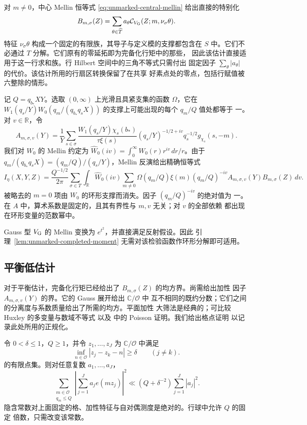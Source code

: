 对 $m\ne0$，中心 Mellin 恒等式
\eqref{eq:unmarked-central-mellin} 给出直接的特别化
\[
 B_{m,\sigma}(Z)=\sum_{\theta\in\widehat T}a_\theta
       \mathcal C_{V_{\rm G}}(Z;m,\nu_\sigma\theta).
\]
特征 $\nu_\sigma\theta$ 构成一个固定的有限族，其导子与定义模的支撑都包含在
$S$ 中。它们不必通过 $T$ 分解。它们原有的零延拓即为完备化行矩中的那些，
因此该估计直接适用于这一行求和族。行 Hilbert 空间中的三角不等式只需付出
固定因子 $\sum_\theta|a_\theta|$ 的代价。该估计所用的行扇区转换保留了在共享
好素点处的零点，包括行赋值被六整除的情形。

记 $Q=q_{b_*}XY$。选取 $(0,\infty)$ 上光滑且具紧支集的函数 $\Omega$，它在
$W_1(q_s/Y)W_0(q_m/(q_{b_*}q_sX))$ 的支撑上可能出现的每个 $q_m/Q$ 值处都等于
一。对 $v\in\mathbb R$，令
\[
 A_{m,\sigma,v}(Y)=\frac1Y\sum_{s\in\sigma}
 \frac{W_1(q_s/Y)\chi_s(b_*)}{\tau\xi(s)}
 (q_s/Y)^{-1/2+iv}q_s^{-1/2}g_{\chi_s}(s,-m).
\]
我们对 $W_0$ 的 Mellin 约定为
$\widehat W_0(iv)=\int_0^\infty W_0(r)r^{iv}\,dr/r$。由于
$q_m/(q_{b_*}q_sX)=(q_m/Q)/(q_s/Y)$，Mellin 反演给出精确恒等式
\begin{equation}\label{eq:low-separated}
 I_\eta(X,Y,Z)=\frac{Q^{-1/2}}{2\pi}
 \sum_{\sigma\in T}\int_{\mathbb R}\widehat W_0(iv)
 \sum_{m\ne0}\Omega(q_m/Q)\xi(m)(q_m/Q)^{-iv}
                 A_{m,\sigma,v}(Y)B_{m,\sigma}(Z)\,dv.
\end{equation}
被略去的 $m=0$ 项由 $W_0$ 的环形支撑而消失。因子 $(q_m/Q)^{-iv}$ 的绝对值为
一。在 $A$ 中，算术系数是固定的，且其有界性与 $m,v$ 无关；对 $v$ 的全部依赖
都出现在环形变量的范数幂中。

Gauss 型 $V_{\rm G}$ 的 Mellin 变换为 $e^{t^2}$，并直接满足反射假设。因此
引理~\ref{lem:unmarked-completed-moment} 无需对该检验函数作环形分解即可适用。

\subsection{平衡低估计}

对于平衡估计，完备化行矩已经给出了 $B_{m,\sigma}(Z)$ 的均方界。尚需给出加性
因子 $A_{m,\sigma,v}(Y)$ 的界。它的 Gauss 展开给出 $\mathbb C/\mathcal O$ 中
互不相同的既约分数；它们之间的分离度与系数质量给出了所需的均方。平面加性
大筛法是经典的；可比较 Huxley 的多变量与数域不等式 \cite{Huxley} 以及
\cite[第~3 节，定理~3]{BaierBansal} 中的 Poisson 证明。我们给出格点证明
以记录此处所用的正规化。

\begin{lemma}[平面加性大筛法]
\label{lem:planar-additive-sieve}
令 $0<\delta\le1$，$Q\ge1$，并令 $z_1,\ldots,z_J$ 为 $\mathbb C/\mathcal O$
中满足
\[
 \inf_{n\in\mathcal O}|z_j-z_k-n|\ge\delta
 \qquad(j\ne k).
\]
的有限点集。则对任意复数 $a_1,\ldots,a_J$，
\[
 \sum_{\substack{m\in\mathcal O\\q_m\le Q}}
 \left|\sum_{j=1}^J a_j e(mz_j)\right|^2
 \ll (Q+\delta^{-2})\sum_{j=1}^J|a_j|^2.
\]
隐含常数对上面固定的格、加性特征与自对偶测度是绝对的。行球中允许 $Q$ 的固定
倍数，只需改变该常数。
\end{lemma}

